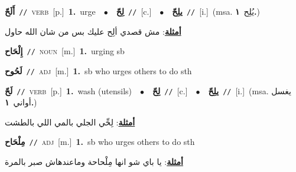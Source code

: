\documentclass[10pt,a4paper,twoside]{article} %
\begin{document}
\begin{multicols}{2}
{\setlength\topsep{0pt}\textbf{\foreignlanguage{arabic}{أَلَحّ}}\ {\color{gray}\texttt{//}\color{black}}\ \textsc{verb}\ [p.]\ \textbf{1.}~urge\ \ $\bullet$\ \ \setlength\topsep{0pt}\textbf{\foreignlanguage{arabic}{لِحّ}}\ {\color{gray}\texttt{//}\color{black}}\ [c.]\ \ $\bullet$\ \ \setlength\topsep{0pt}\textbf{\foreignlanguage{arabic}{يلِحّ}}\ {\color{gray}\texttt{//}\color{black}}\ [i.]\ \color{gray}(msa. \foreignlanguage{arabic}{يُلِح}~\foreignlanguage{arabic}{\textbf{١.}})\color{black}\  \begin{flushright}\color{gray}\foreignlanguage{arabic}{\textbf{\underline{\foreignlanguage{arabic}{أمثلة}}}: مش قصدي ألِح عليك بس من شان الله حاول}\end{flushright}\color{black}} \vspace{2mm}

{\setlength\topsep{0pt}\textbf{\foreignlanguage{arabic}{إِلْحَاح}}\ {\color{gray}\texttt{//}\color{black}}\ \textsc{noun}\ [m.]\ \textbf{1.}~urging sb\ } \vspace{2mm}

{\setlength\topsep{0pt}\textbf{\foreignlanguage{arabic}{لَحُوح}}\ {\color{gray}\texttt{//}\color{black}}\ \textsc{adj}\ [m.]\ \textbf{1.}~sb who urges others to do sth\ } \vspace{2mm}

{\setlength\topsep{0pt}\textbf{\foreignlanguage{arabic}{لَحّ}}\ {\color{gray}\texttt{//}\color{black}}\ \textsc{verb}\ [p.]\ \textbf{1.}~wash (utensils)\ \ $\bullet$\ \ \setlength\topsep{0pt}\textbf{\foreignlanguage{arabic}{لِحّ}}\ {\color{gray}\texttt{//}\color{black}}\ [c.]\ \ $\bullet$\ \ \setlength\topsep{0pt}\textbf{\foreignlanguage{arabic}{يلِحّ}}\ {\color{gray}\texttt{//}\color{black}}\ [i.]\ \color{gray}(msa. \foreignlanguage{arabic}{يغسل أواني}~\foreignlanguage{arabic}{\textbf{١.}})\color{black}\  \begin{flushright}\color{gray}\foreignlanguage{arabic}{\textbf{\underline{\foreignlanguage{arabic}{أمثلة}}}: لِحِّي الجلي بالمي اللي بالطشت}\end{flushright}\color{black}} \vspace{2mm}

{\setlength\topsep{0pt}\textbf{\foreignlanguage{arabic}{مِلْحَاح}}\ {\color{gray}\texttt{//}\color{black}}\ \textsc{adj}\ [m.]\ \textbf{1.}~sb who urges others to do sth\  \begin{flushright}\color{gray}\foreignlanguage{arabic}{\textbf{\underline{\foreignlanguage{arabic}{أمثلة}}}: يا باي شو انها مِلْحاحة وماعندهاش صبر بالمرة}\end{flushright}\color{black}} \vspace{2mm}


\end{multicols}
\end{document}
